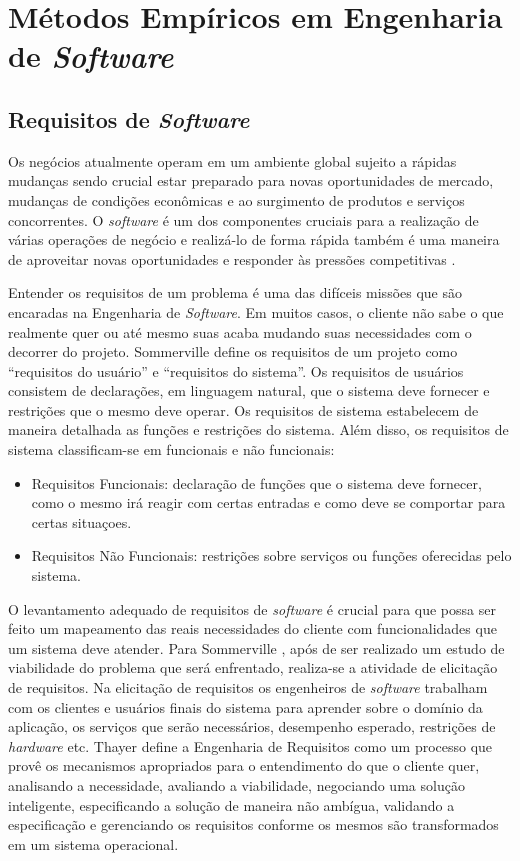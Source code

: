 \chapter{Métodos Empíricos em Engenharia de \textit{Software}}

\section{Requisitos de \textit{Software}}
    Os negócios atualmente operam em um ambiente global sujeito a rápidas mudanças sendo crucial
    estar preparado para novas oportunidades de mercado, mudanças de condições econômicas e ao surgimento
    de produtos e serviços concorrentes. O \textit{software} é um dos componentes cruciais para a realização
    de várias operações de negócio e realizá-lo de forma rápida também é uma maneira de aproveitar novas
    oportunidades e responder às pressões competitivas \cite{sommerville_2006}.

    Entender os requisitos de um problema é uma das difíceis missões
    que são encaradas na Engenharia de \textit{Software}. Em muitos casos, o cliente não sabe o que realmente quer ou até mesmo
    suas acaba mudando suas necessidades com o decorrer do projeto.   Sommerville \cite{sommerville_2006} define os requisitos de um projeto como ``requisitos do usuário'' e ``requisitos do sistema''. Os requisitos de usuários consistem de declarações, em
    linguagem natural, que o sistema deve fornecer e restrições que o mesmo deve
    operar. Os requisitos de sistema estabelecem de maneira detalhada as
    funções e restrições do sistema. Além disso, os requisitos de sistema
    classificam-se em funcionais e não funcionais:

    \begin{itemize}
        \item Requisitos Funcionais: declaração de funções que o sistema deve fornecer, como o mesmo irá reagir com certas entradas e como deve se comportar para certas situaçoes.
        \item Requisitos Não Funcionais: restrições sobre serviços ou funções oferecidas pelo sistema.
    \end{itemize}

    O levantamento adequado de requisitos de \textit{software} é crucial para que possa ser feito um mapeamento das reais necessidades do cliente com funcionalidades que um sistema deve atender. Para Sommerville \cite{sommerville_2006}, após de ser realizado um estudo de viabilidade do problema que será enfrentado, realiza-se a atividade de elicitação de requisitos. Na elicitação de requisitos os engenheiros de \textit{software} trabalham com os clientes e usuários finais do sistema para aprender sobre o domínio da aplicação, os serviços que serão necessários, desempenho esperado, restrições de \textit{hardware} etc. Thayer \cite{thayer_1997} define a Engenharia de Requisitos como um processo que provê os mecanismos apropriados para o entendimento do que o cliente quer, analisando a necessidade, avaliando a viabilidade, negociando uma solução inteligente, especificando a solução de maneira não ambígua, validando a especificação e gerenciando os requisitos conforme os mesmos são transformados em um sistema operacional.

